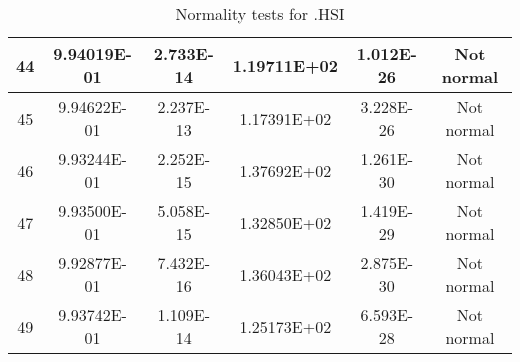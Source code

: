 \begin{table}[h]
\begin{tabular}{|c|c|c|c|c|c|}
		44 & 9.94019E-01 & 2.733E-14 & 1.19711E+02 & 1.012E-26 & Not normal\\\hline
		45 & 9.94622E-01 & 2.237E-13 & 1.17391E+02 & 3.228E-26 & Not normal\\\hline
		46 & 9.93244E-01 & 2.252E-15 & 1.37692E+02 & 1.261E-30 & Not normal\\\hline
		47 & 9.93500E-01 & 5.058E-15 & 1.32850E+02 & 1.419E-29 & Not normal\\\hline
		48 & 9.92877E-01 & 7.432E-16 & 1.36043E+02 & 2.875E-30 & Not normal\\\hline
		49 & 9.93742E-01 & 1.109E-14 & 1.25173E+02 & 6.593E-28 & Not normal\\\hline
	\end{tabular}
	\caption{Normality tests for .HSI}
	\label{tab:normality_tests_HSI}
\end{table}
